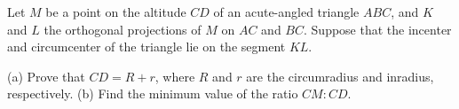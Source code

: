 Let $M$ be a point on the altitude $CD$ of an acute-angled triangle $ABC$, and $K$ and $L$ the orthogonal projections of $M$ on $AC$ and $BC$. Suppose that the incenter and circumcenter of the triangle lie on the segment $KL$.

(a) Prove that $CD=R+r$, where $R$ and $r$ are the circumradius and inradius, respectively.
(b) Find the minimum value of the ratio $CM:CD$.